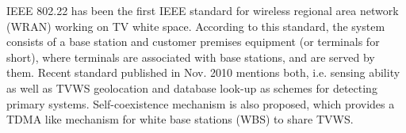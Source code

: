 IEEE 802.22 has been the first IEEE standard for wireless regional area network (WRAN) working on TV white space. According to this standard, the system consists of a base station and customer premises equipment (or terminals for short), where terminals are associated with base stations, and are served by them. Recent standard published in Nov. 2010 mentions both, i.e. sensing ability as well as TVWS geolocation and database look-up as schemes for detecting primary systems. Self-coexistence mechanism is also proposed, which provides a TDMA like mechanism for white base stations (\gls{WBS}) to share TVWS. 

